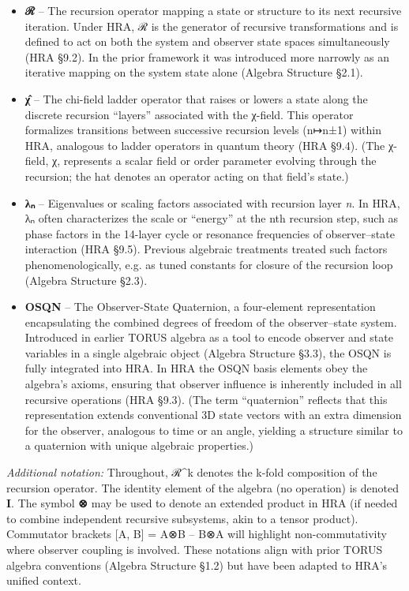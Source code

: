 \documentclass[]{article}
\begin{document}
\begin{itemize}
\item
  \textbf{ℛ} -- The recursion operator mapping a state or structure to
  its next recursive iteration. Under HRA, ℛ is the generator of
  recursive transformations and is defined to act on both the system and
  observer state spaces simultaneously (HRA §9.2). In the prior
  framework it was introduced more narrowly as an iterative mapping on
  the system state alone (Algebra Structure §2.1).
\item
  \textbf{χ̂} -- The chi-field ladder operator that raises or lowers a
  state along the discrete recursion ``layers'' associated with the
  χ-field. This operator formalizes transitions between successive
  recursion levels (n↦n±1) within HRA, analogous to ladder operators in
  quantum theory (HRA §9.4). (The χ-field, χ, represents a scalar field
  or order parameter evolving through the recursion; the hat denotes an
  operator acting on that field's state.)
\item
  \textbf{λₙ} -- Eigenvalues or scaling factors associated with
  recursion layer \emph{n}. In HRA, λₙ often characterizes the scale or
  ``energy'' at the nth recursion step, such as phase factors in the
  14-layer cycle or resonance frequencies of observer--state interaction
  (HRA §9.5). Previous algebraic treatments treated such factors
  phenomenologically, e.g. as tuned constants for closure of the
  recursion loop (Algebra Structure §2.3).
\item
  \textbf{OSQN} -- The Observer-State Quaternion, a four-element
  representation encapsulating the combined degrees of freedom of the
  observer--state system. Introduced in earlier TORUS algebra as a tool
  to encode observer and state variables in a single algebraic object
  (Algebra Structure §3.3), the OSQN is fully integrated into HRA. In
  HRA the OSQN basis elements obey the algebra's axioms, ensuring that
  observer influence is inherently included in all recursive operations
  (HRA §9.3). (The term ``quaternion'' reflects that this representation
  extends conventional 3D state vectors with an extra dimension for the
  observer, analogous to time or an angle, yielding a structure similar
  to a quaternion with unique algebraic properties.)
\end{itemize}

\emph{Additional notation:} Throughout, ℛ\^{}k denotes the k-fold
composition of the recursion operator. The identity element of the
algebra (no operation) is denoted \textbf{I}. The symbol \textbf{⊗} may
be used to denote an extended product in HRA (if needed to combine
independent recursive subsystems, akin to a tensor product). Commutator
brackets {[}A, B{]} = A⊗B -- B⊗A will highlight non-commutativity where
observer coupling is involved. These notations align with prior TORUS
algebra conventions (Algebra Structure §1.2) but have been adapted to
HRA's unified context.
\end{document}
